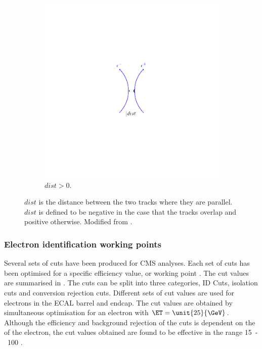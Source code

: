 \begin{figure}[htbp]
\begin{subfigure}{0.45\textwidth}
    \includegraphics[trim = 40mm 40mm 40mm 40mm, clip,width=\textwidth]{dist_p}
    \caption{$dist>0$.}
    \label{fig:dist_p}
  \end{subfigure}
  \caption[$dist$ is the distance between the two tracks where they are
parallel.]{$dist$ is the distance between the two tracks where they are
parallel. $dist$ is defined to be negative in the case that the tracks overlap
and positive otherwise. Modified from \cite{barge2009conversion}. } 
\label{fig:dist}
\end{figure}

\subsubsection{Electron identification working points}

Several sets of cuts have been produced for CMS analyses. Each set of cuts has
been optimised for a specific efficiency value, or working point
\cite{nikos,daskalakis2009data,simplecutbasedeleid}.  The cut values are
summarised in . The cuts can be split into three
categories, ID Cuts, isolation cuts and conversion rejection cuts. Different
sets of cut values are used for electrons in the ECAL barrel and endcap. The cut
values are obtained by simultaneous optimisation for an electron with
$\ET=\unit{25}{\GeV}$. Although the efficiency and background rejection of the
cuts is dependent on the \ET of the electron, the cut values obtained are found
to be effective in the range \unit{15-100}{\GeV} \cite{nikos,daskalakis2009data}.

